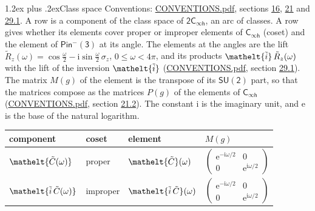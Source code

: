 \documentclass[10pt,a4paper]{article}
\makeatletter
\renewcommand\section{\@startsection{section}{1}{\z@}{-3ex plus -1ex minus -.2ex}%
  {1.2ex plus .2ex}{\normalfont\large\sffamily\bfseries\color{parttitle}}}
\numberwithin{equation}{section}
\newcommand{\eltfont}[1]{{\let\sigma\eltsigma\mathelt{#1}}}
\newcommand{\grp}[1]{\mathsf{#1}}
\newcommand{\comp}[1]{\eltfont{#1}}
\newcommand{\elt}[1]{\eltfont{#1}}
\newcommand{\iunit}{\mathrm{i}}
\newcommand{\expe}{\mathrm{e}}
\newcommand{\lift}[1]{\tilde{#1}}
\newcommand{\pauli}[1]{\sigma_{#1}}
\makeatother
\begin{document}
\section{Class space}\label{s:class_space}
Conventions: \href{../../CONVENTIONS.pdf}{CONVENTIONS.pdf}, sections \href{../../../rotation/CONVENTIONS.pdf\#conv.16}{16}, \href{../../CONVENTIONS.pdf\#conv.21}{21} and \href{../../CONVENTIONS.pdf\#conv.29.1}{29.1}.
\leavevmode\label{n:head.component}A row is a component of the class space of $\grp{2C_{\infty h}}$, an arc of classes. \label{n:head.coset}\label{n:head.element}A row gives whether its elements cover proper or improper elements of \href{../../../rotation/data/pdf/Cinfh.pdf}{$\grp{C_{\infty h}}$} (coset) and the element of $\grp{Pin^{-}(3)}$ at its angle. \label{n:angle.omega}The elements at the angles are the lift $\lift{R}_z(\omega) = \cos\tfrac{\omega}{2} - \iunit\sin\tfrac{\omega}{2}\,\pauli{z}$, $0 \le \omega < 4\pi$, and its products $\elt{\lift{i}}\,\lift{R}_z(\omega)$ with the lift of the inversion $\elt{\lift{i}}$ (\href{../../CONVENTIONS.pdf}{CONVENTIONS.pdf}, section \href{../../CONVENTIONS.pdf\#conv.29.1}{29.1}). \label{n:matrix.element.pin}The matrix $M(g)$ of the element is the transpose of its $\grp{SU(2)}$ part, so that the matrices compose as the matrices $P(g)$ of the elements of \href{../../../rotation/data/pdf/Cinfh.pdf}{$\grp{C_{\infty h}}$} (\href{../../CONVENTIONS.pdf}{CONVENTIONS.pdf}, section \href{../../CONVENTIONS.pdf\#conv.21.2}{21.2}).
The constant $\iunit$ is the imaginary unit, and $\expe$ is the base of the natural logarithm.
\begin{center}\begin{tabular}{@{}llll@{}}\toprule
component & coset & element & $M(g)$\\\midrule
$\comp{\lift{C}(\omega)}$ & proper & $\elt{\lift{C}}(\omega)$ & $\left(\begin{smallmatrix}\expe^{-\iunit\omega/2} & 0\\ 0 & \expe^{\iunit\omega/2}\end{smallmatrix}\right)$\\\addlinespace[6pt]
$\comp{\lift{i}\,\lift{C}(\omega)}$ & improper & $\elt{\lift{i}\,\lift{C}}(\omega)$ & $\left(\begin{smallmatrix}\expe^{-\iunit\omega/2} & 0\\ 0 & \expe^{\iunit\omega/2}\end{smallmatrix}\right)$\\
\bottomrule\end{tabular}\end{center}
\end{document}
